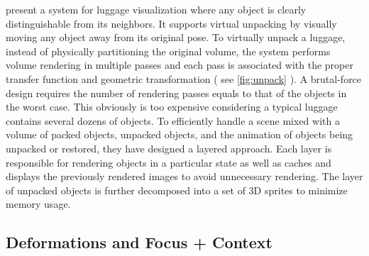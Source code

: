 \cite{Li:2012:LVV:2425296.2425325} present a system for luggage visualization where any object is
clearly distinguishable from its neighbors. It supports virtual unpacking
by visually moving any object away from its original pose. To virtually unpack a luggage, instead of physically partitioning the
original volume, the system performs volume rendering in multiple passes
and each pass is associated with the proper transfer function and geometric
transformation ( see \autoref{fig:unpack} ).  A brutal-force design requires the number
of rendering passes equals to that of the objects in the worst case.
This obviously is too expensive considering a typical luggage contains
several dozens of objects. To efficiently handle a scene mixed
with a volume of packed objects, unpacked objects, and the animation
of objects being unpacked or restored, they have designed a layered
approach. Each layer is responsible for rendering objects in a
particular state as well as caches and displays the previously rendered
images to avoid unnecessary rendering. The layer of unpacked objects
is further decomposed into a set of 3D sprites to minimize
memory usage.

\subsection{Deformations and Focus + Context}

